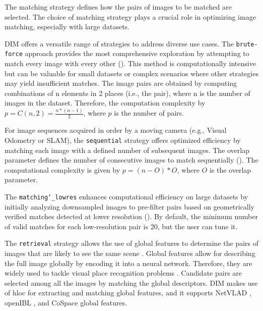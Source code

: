The matching strategy defines how the pairs of images to be matched are selected. The choice of matching strategy plays a crucial role in optimizing image matching, especially with large datasets.  

DIM offers a versatile range of strategies to address diverse use cases. 
The \texttt{brute-force} approach provides the most comprehensive exploration by attempting to match every image with every other (). 
This method is computationally intensive but can be valuable for small datasets or complex scenarios where other strategies may yield insufficient matches. 
The image pairs are obtained by computing combinations of n elements in 2 places (i.e., the pair), where n is the number of images in the dataset. 
Therefore, the computation complexity by $ p = C(n,2) = \frac{n*\left(n-1\right)}{2}$, where $p$ is the number of pairs.

For image sequences acquired in order by a moving camera (e.g., Visual Odometry or SLAM), the \texttt{sequential} strategy offers optimized efficiency by matching each image with a defined number of subsequent images. 
The overlap parameter defines the number of consecutive images to match sequentially ().
The computational complexity is given by $p = \left(n-O\right) * O $, where $O$ is the overlap parameter.

The \texttt{matching\char`_lowres} enhances computational efficiency on large datasets by initially analyzing downsampled images to pre-filter pairs based on geometrically verified matches detected at lower resolution ().
By default, the minimum number of valid matches for each low-resolution pair is 20, but the user can tune it. 

The \texttt{retrieval} strategy allows the use of global features to determine the pairs of images that are likely to see the same scene \citep{Yang2013_imageretrieval}. 
Global features allow for describing the full image globally by encoding it into a neural network. 
Therefore, they are widely used to tackle visual place recognition problems \citep{napoletano2017visual}.
Candidate pairs are selected among all the images by matching the global descriptors.
DIM makes use of hloc \citep{Sarlin_2019_hloc} for extracting and matching global features, and it supports NetVLAD \citep{arandjelovic2016netvlad}, openIBL \citep{ge2020selfsupervising}, and CoSpace \citep{Hong_2019} global features.  

